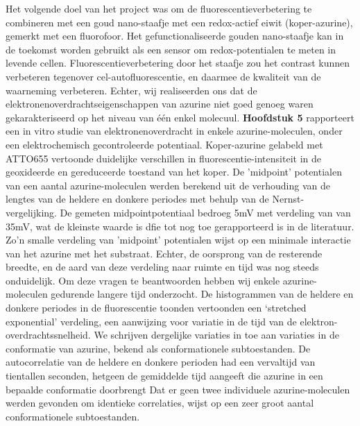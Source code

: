 Het volgende doel van het project was om de fluorescentieverbetering te combineren met een goud nano-staafje met een redox-actief eiwit (koper-azurine), gemerkt met een fluorofoor. Het gefunctionaliseerde gouden nano-staafje kan in de toekomst worden gebruikt als een sensor om redox-potentialen te meten in levende cellen. Fluorescentieverbetering door het staafje zou het contrast kunnen verbeteren tegenover cel-autofluorescentie, en daarmee de kwaliteit van de waarneming verbeteren. Echter, wij realiseerden ons dat de elektronenoverdrachtseigenschappen van azurine niet goed genoeg waren gekarakteriseerd op het niveau van één enkel molecuul. \textbf{Hoofdstuk 5} rapporteert een in vitro studie van elektronenoverdracht in enkele azurine-moleculen, onder een elektrochemisch gecontroleerde potentiaal. Koper-azurine gelabeld met ATTO655 vertoonde duidelijke verschillen in fluorescentie-intensiteit in de geoxideerde en gereduceerde toestand van het koper. De ’midpoint’ potentialen van een aantal azurine-moleculen werden berekend uit de verhouding van de lengtes van de heldere en donkere periodes met behulp van de Nernst-vergelijking. De gemeten midpointpotentiaal bedroeg 5mV met verdeling van  van 35mV, wat de kleinste waarde is dfie tot nog toe  gerapporteerd is in de
literatuur. Zo'n smalle verdeling van ’midpoint’ potentialen wijst op een minimale interactie van het azurine met het substraat. Echter, de oorsprong van de resterende breedte, en de aard van deze verdeling naar ruimte en tijd was nog steeds onduidelijk. Om deze vragen te beantwoorden hebben wij enkele azurine-moleculen gedurende langere tijd onderzocht. De histogrammen van de heldere en donkere periodes in de fluorescentie toonden vertoonden een ‘stretched exponential’ verdeling, een aanwijzing voor variatie in de tijd van de elektron-overdrachtssnelheid. We schrijven dergelijke variaties in toe aan variaties in de conformatie  van azurine, bekend als conformationele subtoestanden. De autocorrelatie van de heldere en donkere perioden had een vervaltijd van tientallen seconden, hetgeen de gemiddelde tijd aangeeft die azurine in een bepaalde conformatie doorbrengt Dat er geen twee individuele azurine-moleculen werden gevonden om identieke correlaties, wijst op  een zeer groot aantal conformationele subtoestanden.